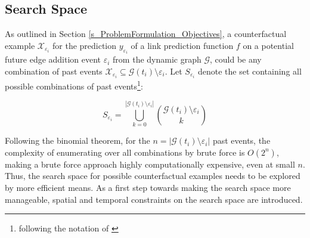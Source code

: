 \subsection{Search Space}
\label{s_Methodology_SearchSpace}



As outlined in Section \ref{s_ProblemFormulation_Objectives}, a counterfactual example $\mathcal{X}_{\varepsilon_i}$ for the prediction $y_{\varepsilon_i}$ of a link prediction function $f$ on a potential future edge addition event $\varepsilon_i$ from the dynamic graph $\mathcal{G}$, could be any combination of past events $\mathcal{X}_{\varepsilon_i} \subseteq \mathcal{G}(t_i) \setminus \varepsilon_i$. Let $S_{\varepsilon_i}$ denote the set containing all possible combinations of past events\footnote{following the notation of \cite{stanley_enumerative_1986}}:

\begin{equation}
    S_{\varepsilon_i} = \bigcup_{k = 0}^{|\mathcal{G}(t_i) \setminus \varepsilon_i|} {\mathcal{G}(t_i) \setminus \varepsilon_i \choose k}
\end{equation}

Following the binomial theorem, for the $n = |\mathcal{G}(t_i) \setminus \varepsilon_i|$ past events, the complexity of enumerating over all combinations by brute force is $O(2^n)$, making a brute force approach highly computationally expensive, even at small $n$. Thus, the search space for possible counterfactual examples needs to be explored by more efficient means. As a first step towards making the search space more manageable, spatial and temporal constraints on the search space are introduced. 

